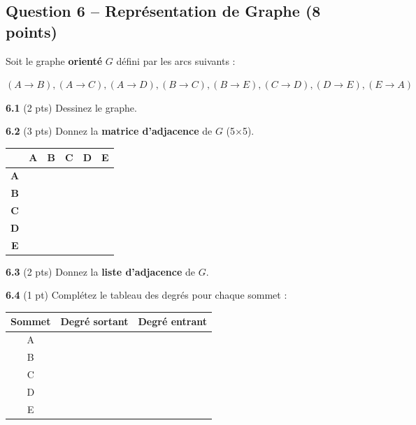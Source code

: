 \documentclass[11pt,letterpaper]{article}
\begin{document}
\newpage

\subsection*{Question 6 -- Représentation de Graphe (8 points)}

Soit le graphe \textbf{orienté} $G$ défini par les arcs suivants :

\begin{center}
$(A \to B), (A \to C), (A \to D), (B \to C), (B \to E), (C \to D), (D \to E), (E \to A)$
\end{center}

\vspace{0.5em}

\textbf{6.1} (2 pts) Dessinez le graphe.

\vspace{5cm}

\textbf{6.2} (3 pts) Donnez la \textbf{matrice d'adjacence} de $G$ (5$\times$5).

\vspace{0.5em}
\begin{center}
\renewcommand{\arraystretch}{1.5}
\begin{tabular}{c|c|c|c|c|c|}
  & \textbf{A} & \textbf{B} & \textbf{C} & \textbf{D} & \textbf{E} \\
\hline
\textbf{A} & & & & & \\
\hline
\textbf{B} & & & & & \\
\hline
\textbf{C} & & & & & \\
\hline
\textbf{D} & & & & & \\
\hline
\textbf{E} & & & & & \\
\hline
\end{tabular}
\end{center}

\vspace{2cm}

\textbf{6.3} (2 pts) Donnez la \textbf{liste d'adjacence} de $G$.

\vspace{4cm}

\textbf{6.4} (1 pt) Complétez le tableau des degrés pour chaque sommet :

\vspace{0.5em}
\begin{center}
\renewcommand{\arraystretch}{1.5}
\begin{tabular}{|c|c|c|}
\hline
\textbf{Sommet} & \textbf{Degré sortant} & \textbf{Degré entrant} \\
\hline
A & & \\
\hline
B & & \\
\hline
C & & \\
\hline
D & & \\
\hline
E & & \\
\hline
\end{tabular}
\end{center}
\end{document}
